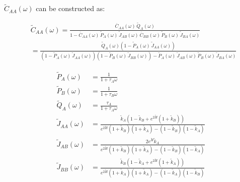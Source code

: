 \documentclass[a4paper, parskip=half]{scrartcl}
\begin{document}
$\widetilde{C}_{AA}(\omega)$ can be constructed as:

\begin{align}
&\widetilde{C}_{AA}(\omega) = \frac{\overline{C}_{AA}(\omega) \, \widetilde{Q}_{A}(\omega)}{1-\overline{C}_{AA}(\omega)\, \widetilde{P}_A(\omega)\, \widetilde{J}_{AB}(\omega)\, \overline{C}_{BB}(\omega)\, \widetilde{P}_B(\omega)\,\widetilde{J}_{BA}(\omega)}\\
&= \frac{\widetilde{Q}_A(\omega)\left(1 - \widetilde{P}_A(\omega)\, \widetilde{J}_{AA}(\omega) \right)}{\left(1 - \widetilde{P}_A(\omega)\, \widetilde{J}_{AA}(\omega) \right)\left(1 - \widetilde{P}_B(\omega)\, \widetilde{J}_{BB}(\omega) \right) - \widetilde{P}_A(\omega)\, \widetilde{J}_{AB}(\omega)\, \widetilde{P}_B(\omega)\, \widetilde{J}_{BA}(\omega)}
\end{align}

\begin{align}
\widetilde{P}_A(\omega) &= \frac{1}{1+\tau_A\omega} \\
\widetilde{P}_B(\omega) &= \frac{1}{1+\tau_B\omega} \\
\widetilde{Q}_A(\omega) &= \frac{\tau_A}{1+\tau_A\omega} \\
\widetilde{J}_{AA}(\omega) &= \frac{\widetilde{k}_A \left(1 - \widetilde{k}_B + e^{2\widetilde{H}} (1 + \widetilde{k}_B)\right)}{e^{2\widetilde{H}}(1 + \widetilde{k}_B)(1 + \widetilde{k}_A) - (1 -  \widetilde{k}_B)(1-\widetilde{k}_A)} \\
\widetilde{J}_{AB}(\omega) &= \frac{2e^{\widetilde{H}} \widetilde{k}_A}{e^{2\widetilde{H}}(1 + \widetilde{k}_B)(1 + \widetilde{k}_A) - (1 -  \widetilde{k}_B)(1-\widetilde{k}_A)} \\
\widetilde{J}_{BB}(\omega) &= \frac{\widetilde{k}_B \left(1 - \widetilde{k}_A + e^{2\widetilde{H}} (1 + \widetilde{k}_A)\right)}{e^{2\widetilde{H}}(1 + \widetilde{k}_A)(1 + \widetilde{k}_A) - (1 -  \widetilde{k}_A)(1-\widetilde{k}_B)}
\end{align}
\end{document}
